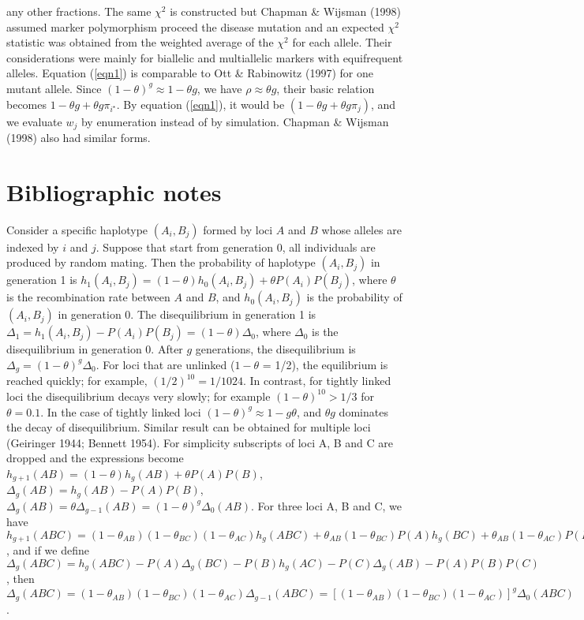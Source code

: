any other fractions.  The same $\chi^2$ is constructed but Chapman \& Wijsman
(1998) assumed marker polymorphism proceed the disease mutation and an
expected $\chi^2$ statistic was obtained from the weighted average of the
$\chi^2$ for each allele.  Their considerations were mainly for biallelic and
multiallelic markers with equifrequent alleles.  Equation (\ref{eqn1}) is
comparable to Ott \& Rabinowitz (1997) for one mutant allele.  Since
$(1-\theta)^g\approx 1-\theta g$, we have $\rho\approx\theta g$, their basic
relation becomes $1-\theta g + \theta g \pi_{i^\star}$.  By equation
(\ref{eqn1}), it would be $(1-\theta g+\theta g\pi_j)$, and we evaluate $w_j$
by enumeration instead of by simulation.  Chapman \& Wijsman (1998) also had
similar forms.


\section{Bibliographic notes}

Consider a specific haplotype $(A_i,B_j)$ formed by loci $A$ and $B$ whose
alleles are indexed by $i$ and $j$.  Suppose that start from generation 0, all
individuals are produced by random mating.  Then the probability of haplotype
$(A_i,B_j)$ in generation 1 is $h_1(A_i,B_j)=(1-\theta)h_0(A_i,B_j)+\theta
P(A_i)P(B_j)$, where $\theta$ is the recombination rate between $A$ and $B$,
and $h_0(A_i,B_j)$ is the probability of $(A_i,B_j)$ in generation 0.  The
disequilibrium in generation 1 is
$\Delta_1=h_1(A_i,B_j)-P(A_i)P(B_j)=(1-\theta)\Delta_0$, where $\Delta_0$ is
the disequilibrium in generation 0.  After $g$ generations, the disequilibrium
is $\Delta_g=(1-\theta)^g\Delta_0$.  For loci that are unlinked ($1-\theta$ =
1/2), the equilibrium is reached quickly; for example, $(1/2)^{10}=1/1024$.  In
contrast, for tightly linked loci the disequilibrium decays very slowly; for
example $(1-\theta)^{10}>1/3$ for $\theta=0.1$.  In the case of tightly linked
loci $(1-\theta)^g\approx 1-g\theta$, and $\theta g$ dominates the decay of
disequilibrium.  Similar result can be obtained for multiple loci (Geiringer
1944; Bennett 1954).  For simplicity subscripts of loci A, B and C are dropped
and the expressions become $h_{g+1}(AB)=(1-\theta)h_g(AB)+\theta P(A)P(B)$,
$\Delta_g(AB)=h_g(AB)-P(A)P(B)$,
$\Delta_g(AB)=\theta\Delta_{g-1}(AB)=(1-\theta)^g\Delta_0(AB)$.  For three loci
A, B and C, we have
$h_{g+1}(ABC)=(1-\theta_{AB})(1-\theta_{BC})(1-\theta_{AC})h_g(ABC)
+\theta_{AB}(1-\theta_{BC})P(A)h_g(BC)+\theta_{AB}(1-\theta_{AC})P(B)h_g(AC)
+\theta_{AC}(1-\theta_{AB})P(C)h_g(AB)$, and if we define
$\Delta_g(ABC)=h_g(ABC)-P(A)\Delta_g(BC)-P(B)h_g(AC)-P(C)\Delta_g(AB)
-P(A)P(B)P(C)$, then
$\Delta_g(ABC)=(1-\theta_{AB})(1-\theta_{BC})(1-\theta_{AC})\Delta_{g-1}(ABC)
=[(1-\theta_{AB})(1-\theta_{BC})(1-\theta_{AC})]^g\Delta_0(ABC)$.

